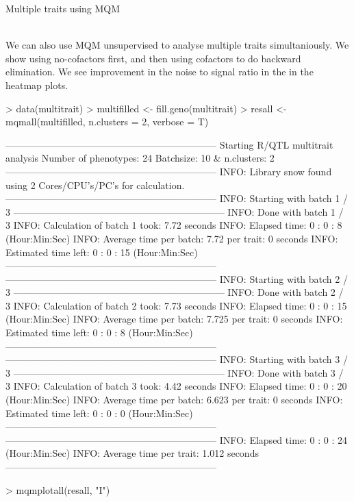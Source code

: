 \documentclass[a4paper]{article}
\begin{document}
\begin{Large} Multiple traits using MQM \end{Large}\\
We can also use MQM unsupervised to analyse multiple traits simultaniously. We show using no-cofactors first, and then using cofactors to do backward elimination. We see improvement in the noise to signal ratio in the in the heatmap plots.
\begin{Schunk}
\begin{Sinput}
> data(multitrait)
> multifilled <- fill.geno(multitrait)
> resall <- mqmall(multifilled, n.clusters = 2, verbose = T)
\end{Sinput}
\begin{Soutput}
------------------------------------------------------------------
Starting R/QTL multitrait analysis
Number of phenotypes: 24 
Batchsize: 10  & n.clusters: 2 
------------------------------------------------------------------
INFO: Library snow found using  2  Cores/CPU's/PC's for calculation.
------------------------------------------------------------------
INFO: Starting with batch 1 / 3 
------------------------------------------------------------------
INFO: Done with batch 1 / 3 
INFO: Calculation of batch 1 took: 7.72 seconds
INFO: Elapsed time: 0 : 0 : 8 (Hour:Min:Sec)
INFO: Average time per batch: 7.72  per trait: 0 seconds
INFO: Estimated time left: 0 : 0 : 15 (Hour:Min:Sec)
------------------------------------------------------------------
------------------------------------------------------------------
INFO: Starting with batch 2 / 3 
------------------------------------------------------------------
INFO: Done with batch 2 / 3 
INFO: Calculation of batch 2 took: 7.73 seconds
INFO: Elapsed time: 0 : 0 : 15 (Hour:Min:Sec)
INFO: Average time per batch: 7.725  per trait: 0 seconds
INFO: Estimated time left: 0 : 0 : 8 (Hour:Min:Sec)
------------------------------------------------------------------
------------------------------------------------------------------
INFO: Starting with batch 3 / 3 
------------------------------------------------------------------
INFO: Done with batch 3 / 3 
INFO: Calculation of batch 3 took: 4.42 seconds
INFO: Elapsed time: 0 : 0 : 20 (Hour:Min:Sec)
INFO: Average time per batch: 6.623  per trait: 0 seconds
INFO: Estimated time left: 0 : 0 : 0 (Hour:Min:Sec)
------------------------------------------------------------------
------------------------------------------------------------------
INFO: Elapsed time: 0 : 0 : 24 (Hour:Min:Sec)
INFO: Average time per trait: 1.012 seconds
------------------------------------------------------------------
\end{Soutput}
\begin{Sinput}
> mqmplotall(resall, "I")
\end{Sinput}
\end{Schunk}
\end{document}
